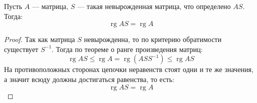 \documentclass[11pt]{article}
\DeclareMathOperator{\rg}{rg}
\begin{document}
\begin{lemma}
    Пусть $A$ --- матрица, $S$ --- такая невырожденная матрица, что определено $AS$. Тогда:
    \[\rg AS = \rg A\]
\end{lemma}

\begin{proof}
    Так как матрица $S$ невырожденна, то по критерию обратимости существует $S^{-1}$. Тогда по теореме о ранге произведения матриц:
    \[\rg AS \leq \rg A = \rg \left(A S S^{-1}\right) \leq \rg AS\]
    На противоположных сторонах цепочки неравенств стоят одни и те же значения, а значит всюду должны достигаться равенства, то есть:
    \[\rg AS = \rg A\]
\end{proof}
\end{document}
